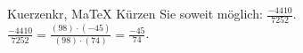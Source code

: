 \begin{MAufgabe}{Kuerzen}{kr, MaTeX}
K\"urzen Sie soweit m\"oglich: $\frac{-4410}{7252}$.\\ 
\ifLsg\MLoesung
\quad $\frac{-4410}{7252}=\frac{(98)\cdot(-45)}{(98)\cdot(74)}=\frac{-45}{74}$.\else\relax\fi
 \end{MAufgabe}